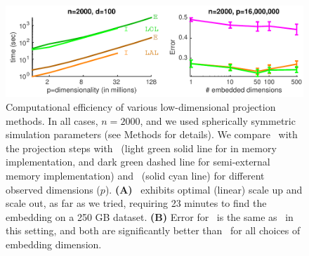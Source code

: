 \documentclass[10pt]{article}
\begin{document}

\begin{figure}[h!]
\centering
\includegraphics[width=1\linewidth]{../Figs/scalability}
\caption{
Computational efficiency of various low-dimensional projection methods. In all cases, $n=2000$, and we used spherically symmetric  simulation parameters (see Methods for details).   We compare \Pca~with the projection steps with \Lol~(light green solid line for in memory implementation, and dark green dashed line for semi-external memory implementation) and \Lfl~(solid cyan line) for different observed dimensions ($p$). \textbf{(A)} \Lol~exhibits optimal (linear) scale up and scale out, as far as we tried, requiring 23 minutes to find the embedding on a 250 GB dataset.  \textbf{(B)} Error for \Lfl~is the same as \Lol~in this setting, and both are significantly better than \PoF~for all choices of embedding dimension.  
}
\label{f:speed}
\end{figure}
\end{document}
